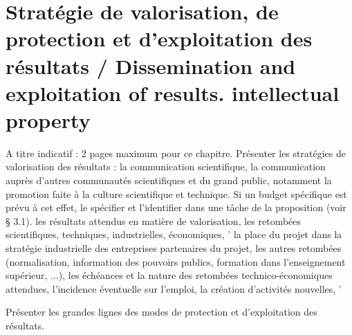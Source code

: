 


\section{Strat\'egie de valorisation, de protection et d'exploitation des r\'esultats / Dissemination and exploitation of results. intellectual property}
\begin{xcomment}   
A titre indicatif : 2 pages maximum pour ce chapitre.
Pr\'esenter les strat\'egies de valorisation des r\'esultats :
la communication scientifique,
la communication aupr\`es d'autres communaut\'es scientifiques et du grand public, notamment la promotion faite à la culture scientifique et technique. Si un budget sp\'ecifique est pr\'evu à cet effet, le sp\'ecifier et l'identifier dans une tâche de la proposition (voir § 3.1).
les r\'esultats attendus en mati\`ere de valorisation,
les retomb\'ees scientifiques, techniques, industrielles, \'economiques, '
la place du projet dans la strat\'egie industrielle des entreprises partenaires du projet,
les autres retomb\'ees (normalisation, information des pouvoirs publics, formation dans l'enseignement sup\'erieur, ...),
les \'ech\'eances et la nature des retomb\'ees technico-\'economiques attendues,
l'incidence \'eventuelle sur l'emploi, la cr\'eation d'activit\'es nouvelles, '

Pr\'esenter les grandes lignes des modes de protection et d'exploitation des r\'esultats.
\end{xcomment}


\endinput

